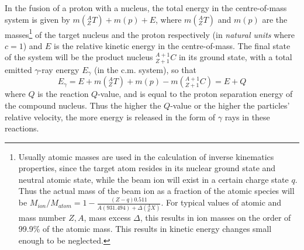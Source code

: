 In the fusion of a proton with a nucleus, the total energy in the centre-of-mass system is given by $m(^{A}_{Z}T)+m(p)+E$, where $m(^{A}_{Z}T)$ and $m(p)$ are the masses\footnote{Usually atomic masses are used in the calculation of inverse kinematics properties, since the target atom resides in its nuclear ground state and neutral atomic state, while the beam ion will exist in a certain charge state $q$. Thus the actual mass of the beam ion as a fraction of the atomic species will be $M_{ion}/M_{atom}=1-\frac{(Z-q)0.511}{A(931.494)+\Delta(^{A}_{Z}X)}$. For typical values of atomic and mass number $Z,A$, mass excess $\Delta$, this results in ion masses  on the order of 99.9\% of the atomic mass. This results in kinetic energy changes small enough to be neglected.} of the target nucleus and the proton respectively (in {\em natural units} where $c=1$) and $E$ is the relative kinetic energy in the centre-of-mass. The final state of the system will be the product nucleus $^{A+1}_{Z+1}C$ in its ground state, with a total emitted $\gamma$-ray energy $E_{\gamma}$ (in the c.m. system), so that
\begin{equation}
E_{\gamma}=E+m(^{A}_{Z}T)+m(p)-m(^{A+1}_{Z+1}C)=E+Q
\end{equation}
where $Q$ is the reaction $Q$-value, and is equal to the proton separation energy of the compound nucleus. Thus the higher the $Q$-value or the higher the particles' relative velocity, the more energy is released in the form of $\gamma$ rays in these reactions. 
 

